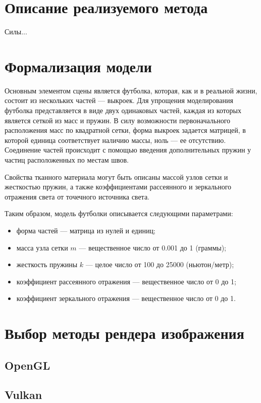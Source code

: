 \section{Описание реализуемого метода}

Силы...

\section{Формализация модели}

Основным элементом сцены является футболка, которая, как и в реальной
жизни, состоит из нескольких частей --- выкроек. Для упрощения моделирования
футболка представляется в виде двух одинаковых частей, каждая из которых
является сеткой из масс и пружин. В силу возможности первоначального
расположения масс по квадратной сетки, форма выкроек задается матрицей, в
которой единица соответствует наличию массы, ноль --- ее отсутствию. Соединение
частей происходит с помощью введения дополнительных пружин у частиц
расположенных по местам швов.

Свойства тканного материала могут быть описаны массой узлов сетки и жесткостью
пружин, а также коэффициентами рассеянного и зеркального отражения света
от точечного источника света.

Таким образом, модель футболки описывается следующими параметрами:
\begin{itemize}
    \item форма частей --- матрица из нулей и единиц;
    \item масса узла сетки $m$ --- вещественное число от 0.001 до 1 (граммы);
    \item жесткость пружины $k$ --- целое число от 100 до 25000 (ньютон/метр);
    \item коэффициент рассеянного отражения --- вещественное число от 0 до 1;
    \item коэффициент зеркального отражения --- вещественное число от 0 до 1.
\end{itemize}

\section{Выбор методы рендера изображения}

\subsection{OpenGL}

\subsection{Vulkan}

